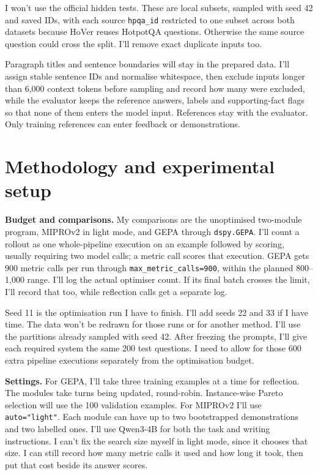 \documentclass[11pt,a4paper]{article}
\begin{document}
{{{I won't use the official hidden tests. These are local subsets, sampled with seed 42 and saved IDs, with each source \texttt{hpqa\_id} restricted to one subset across both datasets because HoVer reuses HotpotQA questions. Otherwise the same source question could cross the split. I'll remove exact duplicate inputs too.

Paragraph titles and sentence boundaries will stay in the prepared data. I'll assign stable sentence IDs and normalise whitespace, then exclude inputs longer than 6,000 context tokens before sampling and record how many were excluded, while the evaluator keeps the reference answers, labels and supporting-fact flags so that none of them enters the model input. References stay with the evaluator. Only training references can enter feedback or demonstrations.

\section{Methodology and experimental setup}
\textbf{Budget and comparisons.} My comparisons are the unoptimised two-module program, MIPROv2 in light mode, and GEPA through \texttt{dspy.GEPA}. I'll count a rollout as one whole-pipeline execution on an example followed by scoring, usually requiring two model calls; a metric call scores that execution. GEPA gets 900 metric calls per run through \texttt{max\_metric\_calls=900}, within the planned 800--1,000 range. I'll log the actual optimiser count. If its final batch crosses the limit, I'll record that too, while reflection calls get a separate log.

Seed 11 is the optimisation run I have to finish. I'll add seeds 22 and 33 if I have time. The data won't be redrawn for those runs or for another method. I'll use the partitions already sampled with seed 42. After freezing the prompts, I'll give each required system the same 200 test questions. I need to allow for those 600 extra pipeline executions separately from the optimisation budget.

\textbf{Settings.} For GEPA, I'll take three training examples at a time for reflection. The modules take turns being updated, round-robin. Instance-wise Pareto selection will use the 100 validation examples. For MIPROv2 I'll use \texttt{auto="light"}. Each module can have up to two bootstrapped demonstrations and two labelled ones. I'll use Qwen3-4B for both the task and writing instructions. I can't fix the search size myself in light mode, since it chooses that size. I can still record how many metric calls it used and how long it took, then put that cost beside its answer scores.

}}}
\end{document}
